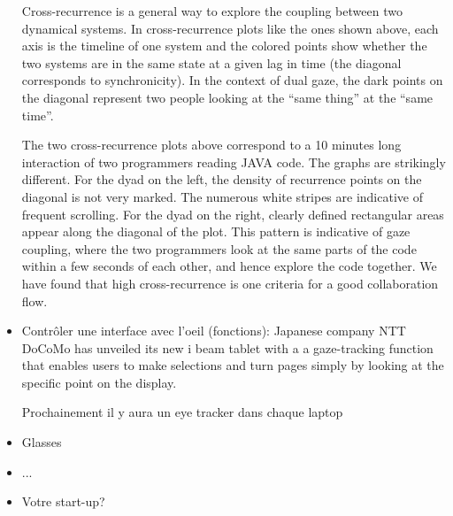 \begin{itemize}
Cross-recurrence is a general way to explore the coupling between two dynamical systems. In cross-recurrence plots like the ones shown above, each axis is the timeline of one system and the colored points show whether the two systems are in the same state at a given lag in time (the diagonal corresponds to synchronicity). In the context of dual gaze, the dark points on the diagonal represent two people looking at the “same thing” at the “same time”.

\begin{figure}[H]
\centering
{}
\end{figure}

The two cross-recurrence plots above correspond to a 10 minutes long interaction of two programmers reading JAVA code. The graphs are strikingly different. For the dyad on the left, the density of recurrence points on the diagonal is not very marked. The numerous white stripes are indicative of frequent scrolling. For the dyad on the right, clearly defined rectangular areas appear along the diagonal of the plot. This pattern is indicative of gaze coupling, where the two programmers look at the same parts of the code within a few seconds of each other, and hence explore the code together. We have found that high cross-recurrence is one criteria for a good collaboration flow.

\item Contr\^oler une interface avec l'oeil (fonctions): Japanese company NTT DoCoMo has unveiled its new i beam tablet with a a gaze-tracking function that enables users to make selections and turn pages simply by looking at the specific point on the display. 

Prochainement il y aura un eye tracker dans chaque laptop
\item Glasses
\item ...
\item Votre start-up?
\end{itemize}

